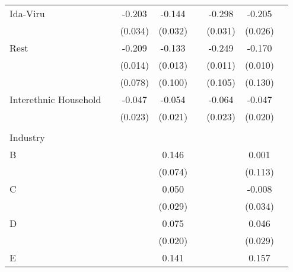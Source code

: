 \begin{longtable}{l*{3}{c}|l*{3}{c}}
Ida-Viru            &                     &      -0.203\sym{***}&      -0.144\sym{***}&                     &      -0.298\sym{***}&      -0.205\sym{***}\\
&                     &     (0.034)         &     (0.032)         &                     &     (0.031)         &     (0.026)         \\
Rest                &                     &      -0.209\sym{***}&      -0.133\sym{***}&                     &      -0.249\sym{***}&      -0.170\sym{***}\\
&                     &     (0.014)         &     (0.013)         &                     &     (0.011)         &     (0.010)         \\
	&                     &     (0.078)         &     (0.100)         &                     &     (0.105)         &     (0.130)         \\
	Interethnic Household&                     &      -0.047\sym{**} &      -0.054\sym{**} &                     &      -0.064\sym{***}&      -0.047\sym{**} \\
	&                     &     (0.023)         &     (0.021)         &                     &     (0.023)         &     (0.020)         \\
		&&&&&&&\\
	Industry &&&&&&\\
	B                   &                     &                     &       0.146\sym{**} &                     &                     &       0.001         \\
	&                     &                     &     (0.074)         &                     &                     &     (0.113)         \\
	C                   &                     &                     &       0.050\sym{*}  &                     &                     &      -0.008         \\
	&                     &                     &     (0.029)         &                     &                     &     (0.034)         \\
	D                   &                     &                     &       0.075\sym{***}&                     &                     &       0.046         \\
	&                     &                     &     (0.020)         &                     &                     &     (0.029)         \\
	E                   &                     &                     &       0.141\sym{***}&                     &                     &       0.157\sym{***}\\

\end{longtable}
